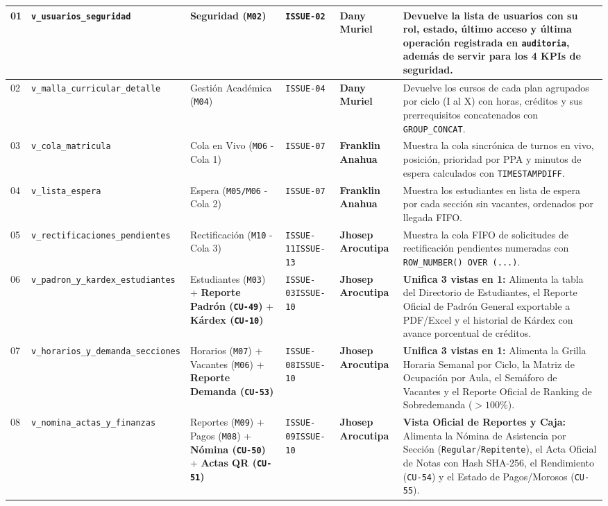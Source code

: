 \documentclass[10pt,a4paper,landscape]{article}
\newcommand{\devDany}{\textbf{\textcolor{unjbgNavy}{Dany Muriel}} \newline {\scriptsize(Lead / QA)}}
\newcommand{\devFranklin}{\textbf{\textcolor{teal!80!black}{Franklin Anahua}} \newline {\scriptsize(Backend / DB)}}
\newcommand{\devJhosep}{\textbf{\textcolor{orange!85!black}{Jhosep Arocutipa}} \newline {\scriptsize(Reportes / UI)}}
\begin{document}
\begin{longtable}{|p{0.5cm}|p{5.0cm}|p{3.8cm}|p{2.0cm}|p{2.5cm}|p{11.4cm}|}
01 & \texttt{v\_usuarios\_seguridad} & Seguridad (\texttt{M02}) & \texttt{ISSUE-02} & \devDany & Devuelve la lista de usuarios con su rol, estado, último acceso y última operación registrada en \texttt{auditoria}, además de servir para los 4 KPIs de seguridad. \\
\hline
\rowcolor{rowAlt}
02 & \texttt{v\_malla\_curricular\_detalle} & Gestión Académica (\texttt{M04}) & \texttt{ISSUE-04} & \devDany & Devuelve los cursos de cada plan agrupados por ciclo (I al X) con horas, créditos y sus prerrequisitos concatenados con \texttt{GROUP\_CONCAT}. \\
\hline
03 & \texttt{v\_cola\_matricula} & Cola en Vivo (\texttt{M06} - Cola 1) & \texttt{ISSUE-07} & \devFranklin & Muestra la cola sincrónica de turnos en vivo, posición, prioridad por PPA y minutos de espera calculados con \texttt{TIMESTAMPDIFF}. \\
\hline
\rowcolor{rowAlt}
04 & \texttt{v\_lista\_espera} & Espera (\texttt{M05/M06} - Cola 2) & \texttt{ISSUE-07} & \devFranklin & Muestra los estudiantes en lista de espera por cada sección sin vacantes, ordenados por llegada FIFO. \\
\hline
05 & \texttt{v\_rectificaciones\_pendientes} & Rectificación (\texttt{M10} - Cola 3) & \texttt{ISSUE-11}\newline \texttt{ISSUE-13} & \devJhosep & Muestra la cola FIFO de solicitudes de rectificación pendientes numeradas con \texttt{ROW\_NUMBER() OVER (...)}. \\
\hline
\rowcolor{rowAlt}
06 & \texttt{v\_padron\_y\_kardex\_estudiantes} & Estudiantes (\texttt{M03}) + \textbf{Reporte Padrón (\texttt{CU-49})} + \textbf{Kárdex (\texttt{CU-10})} & \texttt{ISSUE-03}\newline \texttt{ISSUE-10} & \devJhosep & \textbf{Unifica 3 vistas en 1:} Alimenta la tabla del Directorio de Estudiantes, el Reporte Oficial de Padrón General exportable a PDF/Excel y el historial de Kárdex con avance porcentual de créditos. \\
\hline
07 & \texttt{v\_horarios\_y\_demanda\_secciones} & Horarios (\texttt{M07}) + Vacantes (\texttt{M06}) + \textbf{Reporte Demanda (\texttt{CU-53})} & \texttt{ISSUE-08}\newline \texttt{ISSUE-10} & \devJhosep & \textbf{Unifica 3 vistas en 1:} Alimenta la Grilla Horaria Semanal por Ciclo, la Matriz de Ocupación por Aula, el Semáforo de Vacantes y el Reporte Oficial de Ranking de Sobredemanda ($>100\%$). \\
\hline
\rowcolor{rowAlt}
08 & \texttt{v\_nomina\_actas\_y\_finanzas} & Reportes (\texttt{M09}) + Pagos (\texttt{M08}) + \textbf{Nómina (\texttt{CU-50})} + \textbf{Actas QR (\texttt{CU-51})} & \texttt{ISSUE-09}\newline \texttt{ISSUE-10} & \devJhosep & \textbf{Vista Oficial de Reportes y Caja:} Alimenta la Nómina de Asistencia por Sección (\texttt{Regular}/\texttt{Repitente}), el Acta Oficial de Notas con Hash SHA-256, el Rendimiento (\texttt{CU-54}) y el Estado de Pagos/Morosos (\texttt{CU-55}). \\
\hline
\end{longtable}
\normalsize
\end{document}
